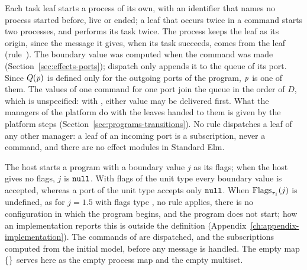 \begin{rulecomments}
 Each task leaf starts a process of its own, with an
identifier that names no process started before, live or ended; a leaf that
occurs twice in a command starts two processes, and performs its task twice.
The process keeps the leaf as its origin, since the message it gives, when
its task succeeds, comes from the leaf (rule~).
 The boundary value was computed when the command was made
(Section~\ref{sec:effects-ports}); dispatch only appends it to the queue of
its port. Since $Q(\mathit{p})$ is defined only for the outgoing ports of the
program, $\mathit{p}$ is one of them. The values of one command for one port
join the queue in the order of $D$, which is unspecified: with
, either value may be delivered first. %
 What the managers of the platform do with the leaves
handed to them is given by the platform steps
(Section~\ref{sec:programs-transitions}). No rule dispatches a leaf of any
other manager: a leaf of an incoming port is a subscription, never a
command, and there are no effect modules in Standard Elm. %
\end{rulecomments}


  {}

\begin{rulecomments}
 The host starts a program with a boundary value $j$ as
its flags; when the host gives no flags, $j$ is $\mathtt{null}$. %
With flags of the unit type every boundary value is accepted, whereas a port of
the unit type accepts only $\mathtt{null}$. %
When $\mathrm{Flags}_{\tau_1}(j)$ is undefined, as for $j=1.5$ with flags type
, no rule applies, there is no configuration in which the program
begins, and the program does not start; how an implementation reports this
is outside the definition (Appendix~\ref{ch:appendix-implementation}). %
The commands of  are dispatched, and the subscriptions computed from
the initial model, before any message is handled. The empty map
$\{\}$ serves here as the empty process map and the empty multiset.
\end{rulecomments}


